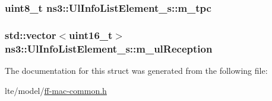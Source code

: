 \subsubsection[{\texorpdfstring{m\+\_\+tpc}{m_tpc}}]{\setlength{\rightskip}{0pt plus 5cm}uint8\+\_\+t ns3\+::\+Ul\+Info\+List\+Element\+\_\+s\+::m\+\_\+tpc}\hypertarget{structns3_1_1UlInfoListElement__s_a2b029531a9d2bf62b15912f6056b4aab}{}\label{structns3_1_1UlInfoListElement__s_a2b029531a9d2bf62b15912f6056b4aab}
\subsubsection[{\texorpdfstring{m\+\_\+ul\+Reception}{m_ulReception}}]{\setlength{\rightskip}{0pt plus 5cm}std\+::vector$<$uint16\+\_\+t$>$ ns3\+::\+Ul\+Info\+List\+Element\+\_\+s\+::m\+\_\+ul\+Reception}\hypertarget{structns3_1_1UlInfoListElement__s_ab08157fa74477634814d352509a0bb4d}{}\label{structns3_1_1UlInfoListElement__s_ab08157fa74477634814d352509a0bb4d}


The documentation for this struct was generated from the following file\+:\begin{DoxyCompactItemize}
\item 
lte/model/\hyperlink{ff-mac-common_8h}{ff-\/mac-\/common.\+h}\end{DoxyCompactItemize}
